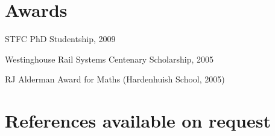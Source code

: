 \documentclass[10pt]{article}
\renewenvironment{compactitem}{
  \begin{list}{}{
    \setlength{\leftmargin}{1.5em}
  }
}{
  \end{list}
}
\begin{document}
\section*{Awards}
\begin{compactitem}
\item STFC PhD Studentship, 2009
\item Westinghouse Rail Systems Centenary Scholarship, 2005
\item RJ Alderman Award for Maths (Hardenhuish School, 2005)
\end{compactitem}

\section*{References available on request}
%

\end{document}
